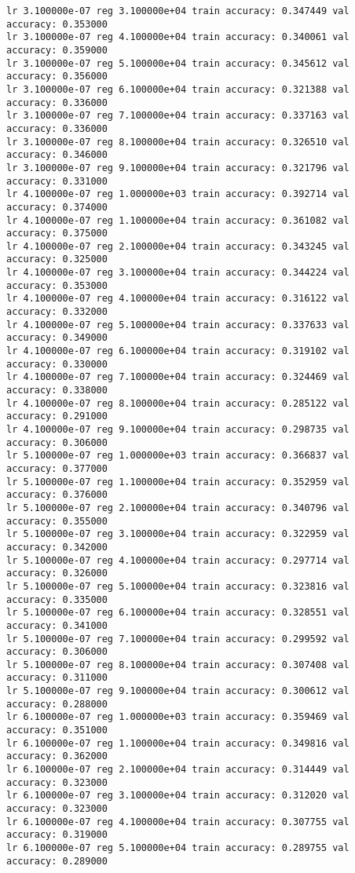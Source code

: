 \documentclass[11pt]{article}
\begin{document}
\begin{Verbatim}[commandchars=\\\{\}]
lr 3.100000e-07 reg 3.100000e+04 train accuracy: 0.347449 val accuracy: 0.353000
lr 3.100000e-07 reg 4.100000e+04 train accuracy: 0.340061 val accuracy: 0.359000
lr 3.100000e-07 reg 5.100000e+04 train accuracy: 0.345612 val accuracy: 0.356000
lr 3.100000e-07 reg 6.100000e+04 train accuracy: 0.321388 val accuracy: 0.336000
lr 3.100000e-07 reg 7.100000e+04 train accuracy: 0.337163 val accuracy: 0.336000
lr 3.100000e-07 reg 8.100000e+04 train accuracy: 0.326510 val accuracy: 0.346000
lr 3.100000e-07 reg 9.100000e+04 train accuracy: 0.321796 val accuracy: 0.331000
lr 4.100000e-07 reg 1.000000e+03 train accuracy: 0.392714 val accuracy: 0.374000
lr 4.100000e-07 reg 1.100000e+04 train accuracy: 0.361082 val accuracy: 0.375000
lr 4.100000e-07 reg 2.100000e+04 train accuracy: 0.343245 val accuracy: 0.325000
lr 4.100000e-07 reg 3.100000e+04 train accuracy: 0.344224 val accuracy: 0.353000
lr 4.100000e-07 reg 4.100000e+04 train accuracy: 0.316122 val accuracy: 0.332000
lr 4.100000e-07 reg 5.100000e+04 train accuracy: 0.337633 val accuracy: 0.349000
lr 4.100000e-07 reg 6.100000e+04 train accuracy: 0.319102 val accuracy: 0.330000
lr 4.100000e-07 reg 7.100000e+04 train accuracy: 0.324469 val accuracy: 0.338000
lr 4.100000e-07 reg 8.100000e+04 train accuracy: 0.285122 val accuracy: 0.291000
lr 4.100000e-07 reg 9.100000e+04 train accuracy: 0.298735 val accuracy: 0.306000
lr 5.100000e-07 reg 1.000000e+03 train accuracy: 0.366837 val accuracy: 0.377000
lr 5.100000e-07 reg 1.100000e+04 train accuracy: 0.352959 val accuracy: 0.376000
lr 5.100000e-07 reg 2.100000e+04 train accuracy: 0.340796 val accuracy: 0.355000
lr 5.100000e-07 reg 3.100000e+04 train accuracy: 0.322959 val accuracy: 0.342000
lr 5.100000e-07 reg 4.100000e+04 train accuracy: 0.297714 val accuracy: 0.326000
lr 5.100000e-07 reg 5.100000e+04 train accuracy: 0.323816 val accuracy: 0.335000
lr 5.100000e-07 reg 6.100000e+04 train accuracy: 0.328551 val accuracy: 0.341000
lr 5.100000e-07 reg 7.100000e+04 train accuracy: 0.299592 val accuracy: 0.306000
lr 5.100000e-07 reg 8.100000e+04 train accuracy: 0.307408 val accuracy: 0.311000
lr 5.100000e-07 reg 9.100000e+04 train accuracy: 0.300612 val accuracy: 0.288000
lr 6.100000e-07 reg 1.000000e+03 train accuracy: 0.359469 val accuracy: 0.351000
lr 6.100000e-07 reg 1.100000e+04 train accuracy: 0.349816 val accuracy: 0.362000
lr 6.100000e-07 reg 2.100000e+04 train accuracy: 0.314449 val accuracy: 0.323000
lr 6.100000e-07 reg 3.100000e+04 train accuracy: 0.312020 val accuracy: 0.323000
lr 6.100000e-07 reg 4.100000e+04 train accuracy: 0.307755 val accuracy: 0.319000
lr 6.100000e-07 reg 5.100000e+04 train accuracy: 0.289755 val accuracy: 0.289000

\end{Verbatim}
\end{document}
